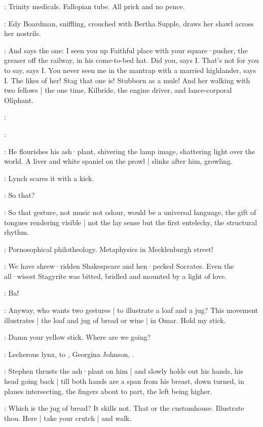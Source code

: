 \Bawd:
Trinity medicals.
Fallopian tube.
All prick and no pence.

:
Edy Boardman,
sniffling,
crouched with Bertha Supple,
draws her shawl across her nostrils.

\Edy:
And says the one:
I seen you up Faithful place with your square·pusher,
the greaser off the railway,
in his come-to-bed hat.
Did you,
says I.
That's not for you to say,
says I.
You never seen
me in the mantrap with a married highlander,
says I.
The likes of her!
Stag that one is!
Stubborn as a mule!
And her walking with two fellows |
the one time,
Kilbride,
the engine driver,
and lance-corporal Oliphant.

:

\Stephen:

:
He flourishes his ash·plant,
shivering the lamp image,
shattering light over the world.
A liver and white spaniel on the prowl |
slinks after him,
growling.

:
Lynch scares it with a kick.

\Lynch:
So that?

\Stephen:
\sout{}
So that gesture,
not music not odour,
would be a universal language,
the gift of tongues rendering visible |
not the lay sense
but the first entelechy,
the structural rhythm.

\Lynch:
Pornosophical philotheology.
Metaphysics in Mecklenburgh street!

\Stephen:
We have shrew·ridden Shakespeare and hen·pecked Socrates.
Even the all·wisest Stagyrite was bitted,
bridled and mounted by a light of love.

\Lynch:
Ba!

\Stephen:
Anyway,
who wants two gestures |
to illustrate a loaf and a jug?
This movement illustrates |
the loaf and jug of bread or wine |
in Omar.
Hold my stick.

\Lynch:
Damn your yellow stick.
Where are we going?

\Stephen:
Lecherous lynx,
to ,
Georgina Johnson,
.

:
Stephen thrusts the ash·plant on him |
and slowly holds out his hands,
his head going back |
till both hands are a span from his breast,
down turned,
in planes intersecting,
the fingers about to part,
the left being higher.

\Lynch:
Which is the jug of bread?
It skills not.
That or the customhouse.
Illustrate thou.
Here |
take your crutch |
and walk.

